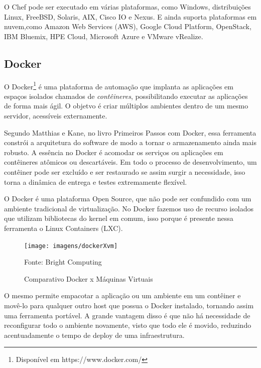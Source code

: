 O Chef pode ser executado em várias plataformas, como Windows, distribuições Linux, FreeBSD, Solaris, AIX, Cisco IO e Nexus. E ainda suporta plataformas em nuvem,como Amazon Web Services (AWS), Google Cloud Platform, OpenStack, IBM Bluemix, HPE Cloud, Microsoft Azure e VMware vRealize.

\subsection{Docker}

O Docker\footnote{Disponível em https://www.docker.com/} é uma plataforma de automação que implanta as aplicações em espaços isolados chamados de \textit{contêineres}, possibilitando executar as aplicações de forma mais ágil. O objetvo é criar múltiplos ambientes dentro de um mesmo servidor, acessíveis externamente.

Segundo Matthias e Kane, no livro Primeiros Passos com Docker, essa ferramenta constrói a arquitetura do software de modo a tornar o armazenamento ainda mais robusto. A essência no Docker é acomodar os serviços ou aplicações em contêineres atômicos ou descartáveis. Em todo o processo de desenvolvimento, um contêiner pode ser excluído e ser restaurado se assim surgir a necessidade, isso torna a dinâmica de entrega e testes extremamente flexível.\cite{mattiaskane}

O Docker é uma plataforma Open Source, que não pode ser confundido com um ambiente tradicional de virtualização. No Docker fazemos uso de recurso isolados que utilizam bibliotecas do kernel em comum, isso porque é presente nessa ferramenta o Linux Containers (LXC).

\begin{figure} [htb]
	\centering
	
	\texttt{[image: imagens/dockerXvm]}
	\caption{Comparativo Docker x Máquinas Virtuais}
	Fonte: Bright Computing\footnotemark
	\label{fig:dockerXvm}
	
\end{figure}


O mesmo permite empacotar a aplicação ou um ambiente em um contêiner e movê-lo para qualquer outro host que possua o Docker instalado, tornando assim uma ferramenta portável. A grande vantagem disso é que não há necessidade de reconfigurar todo o ambiente novamente, visto que todo ele é movido, reduzindo acentuadamente o tempo de deploy de uma infraestrutura.


